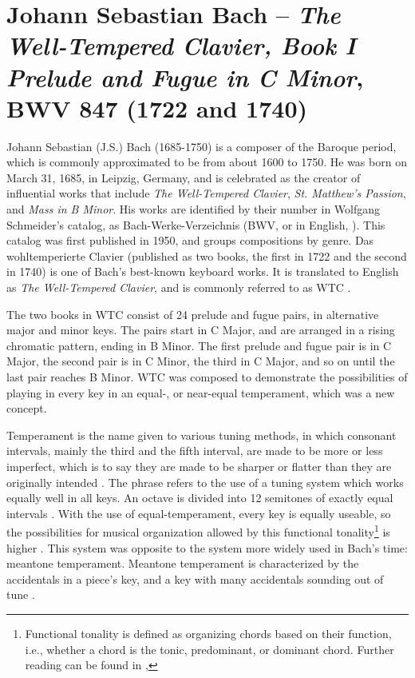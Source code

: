 \chapter[J.S. Bach and \textit{The Well-Tempered Clavier, Book I} BWV 847]{Johann Sebastian Bach – \textit{The Well-Tempered Clavier, Book I Prelude and Fugue in C Minor}, BWV 847 (1722 and 1740)}\label{bach-chapter}

Johann Sebastian (J.S.) Bach (1685-1750) is a composer of the Baroque period, which is commonly approximated to be from about 1600 to 1750. He was born on March 31, 1685, in Leipzig, Germany, and is celebrated as the creator of influential works that include \textit{The Well-Tempered Clavier}, \textit{St. Matthew's Passion}, and \textit{Mass in B Minor}. His works are identified by their number in Wolfgang Schmeider's catalog, as Bach-Werke-Verzeichnis (BWV, or in English, ). This catalog was first published in 1950, and groups compositions by genre. Das wohltemperierte Clavier (published as two books, the first in 1722 and the second in 1740) is one of Bach's best-known keyboard works. It is translated to English as \textit{The Well-Tempered Clavier}, and is commonly referred to as WTC \autocite{Lindley_2001}.

The two books in WTC consist of 24 prelude and fugue pairs, in alternative major and minor keys. The pairs start in C Major, and are arranged in a rising chromatic pattern, ending in B Minor. The first prelude and fugue pair is in C Major, the second pair is in C Minor, the third in C\musSharp{} Major, and so on until the last pair reaches B Minor. WTC was composed to demonstrate the possibilities of playing in every key in an equal-, or near-equal temperament, which was a new concept. 

Temperament is the name given to various tuning methods, in which consonant intervals, mainly the third and the fifth interval, are made to be more or less imperfect, which is to say they are made to be sharper or flatter than they are originally intended \autocite{Grove_1895}. The phrase  refers to the use of a tuning system which works equally well in all keys. An octave is divided into 12 semitones of exactly equal intervals \autocite{Whitcomb_2017}. With the use of equal-temperament, every key is equally useable, so the possibilities for musical organization allowed by this functional tonality\footnote{Functional tonality is defined as organizing chords based on their function, i.e., whether a chord is the tonic, predominant, or dominant chord. Further reading can be found in \citeauthor{Marshall_Emery_2019}, } is higher \autocite{Marshall_Emery_2019}. This system was opposite to the system more widely used in Bach's time: meantone temperament. Meantone temperament is characterized by the accidentals in a piece's key, and a key with many accidentals sounding out of tune \autocite{Grove_1895}. 

